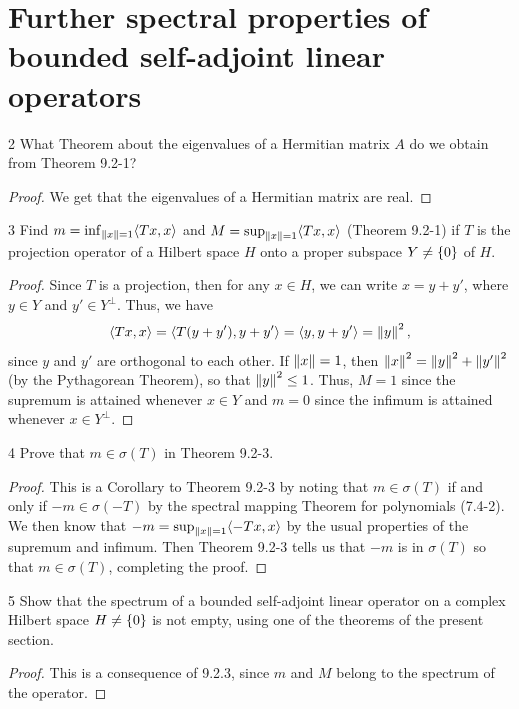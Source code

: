 \section{Further spectral properties of bounded self-adjoint linear operators}


\begin{exercise}{2}
What Theorem about the eigenvalues of a Hermitian matrix $A$ do we obtain from Theorem 9.2-1?
\end{exercise}
\begin{proof}
We get that the eigenvalues of a Hermitian matrix are real.
\end{proof} 

\begin{exercise}{3}
Find $m = \inf_{\left\lVert x\right\rVert=1} \langle Tx, x\rangle$ and $M = \sup_{\left\lVert x\right\rVert=1} \langle Tx, x\rangle$ (Theorem 9.2-1) if $T$ is the projection operator of a Hilbert space $H$ onto a proper subspace $Y \neq \{0\}$ of $H$.
\end{exercise}
\begin{proof}
Since $T$ is a projection, then for any $x \in H$, we can write $x = y + y'$, where $y \in Y$ and $y' \in Y^\perp$.
Thus, we have 
\begin{align*}
    \langle Tx, x\rangle
    = \langle T(y + y'), y + y'\rangle
    = \langle y, y + y'\rangle
    = \left\lVert y\right\rVert^2,
\end{align*}
since $y$ and $y'$ are orthogonal to each other.
If $\left\lVert x\right\rVert = 1$, then $\left\lVert x\right\rVert^2 = \left\lVert y\right\rVert^2 + \left\lVert y'\right\rVert^2$ (by the Pythagorean Theorem), so that $\left\lVert y\right\rVert^2 \leq 1$.
Thus, $M = 1$ since the supremum is attained whenever $x \in Y$ and $m = 0$ since the infimum is attained whenever $x \in Y^\perp$.
\end{proof} 

\begin{exercise}{4}
Prove that $m \in \sigma(T)$ in Theorem 9.2-3.
\end{exercise}
\begin{proof}
This is a Corollary to Theorem 9.2-3 by noting that $m \in \sigma(T)$ if and only if $-m \in \sigma(-T)$ by the spectral mapping Theorem for polynomials (7.4-2).
We then know that $-m = \sup_{\left\lVert x\right\rVert = 1} \langle -Tx, x\rangle$ by the usual properties of the supremum and infimum.
Then Theorem 9.2-3 tells us that $-m$ is in $\sigma(T)$ so that $m \in \sigma(T)$, completing the proof.
\end{proof} 

\begin{exercise}{5}
Show that the spectrum of a bounded self-adjoint linear operator on a complex Hilbert space $H \neq \{0\}$ is not empty, using one of the theorems of the present section.
\end{exercise}
\begin{proof}
This is a consequence of 9.2.3, since $m$ and $M$ belong to the spectrum of the operator.
\end{proof} 

